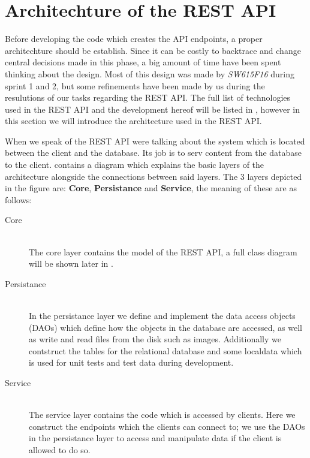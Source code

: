 \section{Architechture of the REST API}\label{architechture}
Before developing the code which creates the API endpoints, a proper architechture should be establish. 
Since it can be costly to backtrace and change central decisions made in this phase, a big amount of time have been spent thinking about the design. 
Most of this design was made by \textit{SW615F16} during sprint 1 and 2, but some refinements have been made by us during the resulutions of our tasks regarding the REST API. 
The full list of technologies used in the REST API and the development hereof will be listed in , however in this section we will introduce the architecture used in the REST API. 


When we speak of the REST API were talking about the system which is located between the client and the database.
Its job is to serv content from the database to the client. 
 contains a diagram which explains the basic layers of the architecture alongside the connections between said layers. 
The 3 layers depicted in the figure are: \textbf{Core}, \textbf{Persistance} and \textbf{Service}, the meaning of these are as follows:
\begin{description}
    \item[Core] \hfill \\
    The core layer contains the model of the REST API, a full class diagram will be shown later in .

    \item[Persistance] \hfill \\ 
    In the persistance layer we define and implement the data access objects (DAOs) which define how the objects in the database are accessed, as well as write and read files from the disk such as images. 
    Additionally we contstruct the tables for the relational database and some localdata which is used for unit tests and test data during development. 

    \item[Service] \hfill \\ 
    The service layer contains the code which is accessed by clients.
    Here we construct the endpoints which the clients can connect to; we use the DAOs in the persistance layer to access and manipulate data if the client is allowed to do so. 
\end{description}

